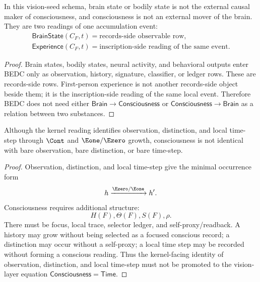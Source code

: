 \begin{corollary}
\label{cor:brain-state-experience-two-readings}
In this vision-seed schema, brain state or bodily state is not the external
causal maker of consciousness, and consciousness is not an external mover of
the brain. They are two readings of one accumulation event:
$$
\begin{gathered}
\mathsf{BrainState}(C_F,t)=\text{records-side observable row},\\
\mathsf{Experience}(C_F,t)=\text{inscription-side reading of the same event}.
\end{gathered}
$$
\end{corollary}

\begin{proof}
Brain states, bodily states, neural activity, and behavioral outputs enter
BEDC only as observation, history, signature, classifier, or ledger rows.
These are records-side rows. First-person experience is not another
records-side object beside them; it is the inscription-side reading of the
same local event. Therefore BEDC does not need either
$\mathsf{Brain}\to\mathsf{Consciousness}$ or
$\mathsf{Consciousness}\to\mathsf{Brain}$ as a relation between two
substances.
\end{proof}

\begin{theorem}
\label{thm:consciousness-not-identical-observation-distinction-time}
Although the kernel reading identifies observation, distinction, and local
time-step through $\Cont$ and $\Eone/\Ezero$ growth, consciousness is not
identical with bare observation, bare distinction, or bare time-step.
\end{theorem}

\begin{proof}
Observation, distinction, and local time-step give the minimal occurrence
form
$$
h\xrightarrow{\Ezero/\Eone}h'.
$$
Consciousness requires additional structure:
$$
H(F),\Theta(F),S(F),\rho.
$$
There must be focus, local trace, selector ledger, and self-proxy/readback.
A history may grow without being selected as a focused conscious record; a
distinction may occur without a self-proxy; a local time step may be
recorded without forming a conscious reading. Thus the kernel-facing
identity of observation, distinction, and local time-step must not be
promoted to the vision-layer equation
$\mathsf{Consciousness}=\mathsf{Time}$.
\end{proof}

